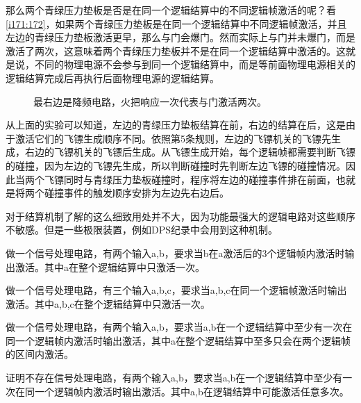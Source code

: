 那么两个青绿压力垫板是否是在同一个逻辑结算中的不同逻辑帧激活的呢？看\autoref{i171:172}，如果两个青绿压力垫板是在同一个逻辑结算中不同逻辑帧激活，并且左边的青绿压力垫板激活更早，那么与门会爆门。然而实际上与门并未爆门，而是激活了两次，这意味着两个青绿压力垫板并不是在同一个逻辑结算中激活的。这就是说，不同的物理电源不会参与到同一个逻辑结算中，而是等前面物理电源相关的逻辑结算完成后再执行后面物理电源的逻辑结算。

\begin{figure}[!ht]
\begin{center}
\qquad
{}
\end{center}
\caption{最右边是降频电路，火把响应一次代表与门激活两次。}
\label{i171:172}
\end{figure}

从上面的实验可以知道，左边的青绿压力垫板结算在前，右边的结算在后，这是由于激活它们的飞镖生成顺序不同。依照第5条规则，左边的飞镖机关的飞镖先生成，右边的飞镖机关的飞镖后生成。从飞镖生成开始，每个逻辑帧都需要判断飞镖的碰撞，因为左边的飞镖先生成，所以判断碰撞时先判断左边飞镖的碰撞情况。因此当两个飞镖同时与青绿压力垫板碰撞时，程序将左边的碰撞事件排在前面，也就是将两个碰撞事件的触发顺序安排为左边先右边后。

对于结算机制了解的这么细致用处并不大，因为功能最强大的逻辑电路对这些顺序不敏感。但是一些极限装置，例如DPS纪录中会用到这种机制。

\begin{problemset}[思考题]
\item 做一个信号处理电路，有两个输入a,b，要求当b在a激活后的3个逻辑帧内激活时输出激活。其中a在整个逻辑结算中只激活一次。
\item 做一个信号处理电路，有三个输入a,b,c，要求当a,b,c在同一个逻辑帧激活时输出激活。其中a,b,c在整个逻辑结算中只激活一次。
\item 做一个信号处理电路，有两个输入a,b，要求当a,b在一个逻辑结算中至少有一次在同一个逻辑帧内激活时输出激活，其中a在整个逻辑结算中至多只会在两个逻辑帧的区间内激活。
\item 证明不存在信号处理电路，有两个输入a,b，要求当a,b在一个逻辑结算中至少有一次在同一个逻辑帧内激活时输出激活。其中a,b在逻辑结算中可能激活任意多次。
\end{problemset}